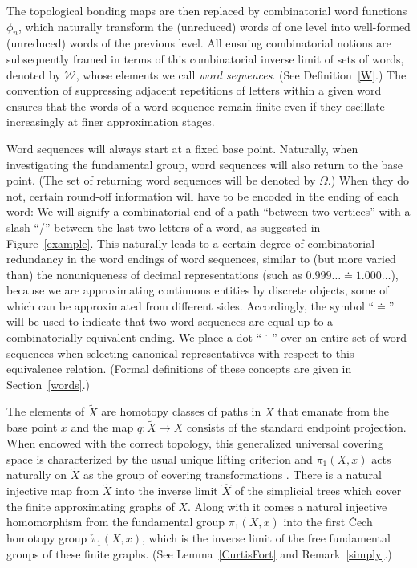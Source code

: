 \documentclass{amsart}
\theoremstyle{definition}
\theoremstyle{remark}
\numberwithin{equation}{section}
\begin{document}
 The topological bonding maps are then replaced by combinatorial word functions $\phi_n$, which naturally transform the (unreduced) words of one level into well-formed (unreduced) words of the previous level.
 All ensuing combinatorial notions are subsequently framed in terms of this combinatorial inverse limit of sets of words, denoted by $\mathcal W$, whose elements we call {\em word sequences}. (See Definition~\ref{W}.)
  The convention of suppressing adjacent repetitions of letters within a given word ensures that the words of a word sequence remain finite even if they oscillate increasingly at finer approximation stages.

Word sequences will always start at a fixed base point. Naturally, when investigating the fundamental group, word sequences will also return to the base point. (The set of returning word sequences will be denoted by $\Omega$.) When they do not, certain round-off information will have to be encoded in the ending of each word: We will signify a combinatorial end of a path ``between two vertices'' with a slash ``/'' between the last two letters of a word, as suggested in Figure~\ref{example}.
This naturally leads to a certain degree of combinatorial redundancy in the word endings of word sequences,
 similar to (but more varied than) the nonuniqueness of decimal representations (such as $0.999\ldots\doteq 1.000\ldots$), because we are approximating continuous entities by discrete objects, some of which can be approximated from different sides.
Accordingly, the symbol ``$\doteq$'' will be used to indicate that two word sequences are equal up to a combinatorially equivalent ending. We place a dot ``$\dot{\mbox{\hspace{5pt} }}$'' over an entire set of word sequences when selecting canonical representatives with respect to this equivalence relation. (Formal definitions of these concepts are given in Section~\ref{words}.)

 The elements of $\tilde{X}$ are homotopy classes of paths in $X$ that emanate from the base point $x$  and the  map $q:\tilde{X}\rightarrow X$ consists of the standard endpoint projection.
 When endowed with the correct topology, this generalized universal covering space is characterized by the usual unique lifting criterion and $\pi_1(X,x)$  acts naturally on $\tilde{X}$ as the group of covering transformations \cite{FZ2}.
 There is a natural injective map from $\tilde{X}$ into the inverse limit $\hat{X}$ of the simplicial trees which cover the finite approximating graphs of $X$.  Along with it comes a natural injective homomorphism from the fundamental group $\pi_1(X,x)$ into the first \v{C}ech homotopy group $\check{\pi}_1(X,x)$, which is the inverse limit  of the free fundamental groups of these finite graphs. (See Lemma~\ref{CurtisFort} and Remark~\ref{simply}.)
\end{document}
